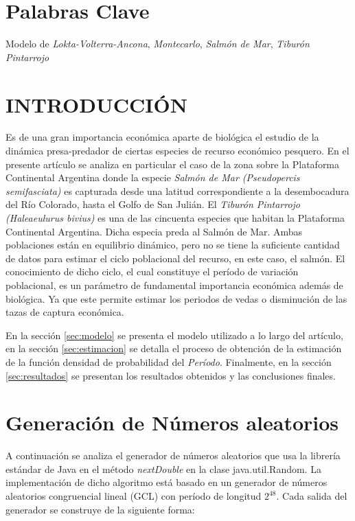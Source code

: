 \documentclass{SPANISH_acm_proc_article-sp}
\begin{document}
\section*{Palabras Clave}
Modelo de \textit{Lokta-Volterra-Ancona}, \textit{Montecarlo}, \textit{Salm\'on de Mar},
\textit{Tibur\'on Pintarrojo}

\section{INTRODUCCI\'ON}
Es de una gran importancia econ\'omica aparte de biol\'ogica el estudio de la din\'amica
presa-predador de ciertas especies de recurso econ\'omico pesquero. En el presente art\'iculo
se analiza en particular el caso de la zona sobre la Plataforma Continental Argentina donde
la especie \emph{Salm\'on de Mar (Pseudopercis semifasciata)} es capturada desde una
latitud correspondiente a la desembocadura del R\'io Colorado, hasta el Golfo de San Juli\'an.
El \emph{Tibur\'on Pintarrojo (Haleaeulurus bivius)} es una de las cincuenta especies que
habitan la Plataforma Continental Argentina. Dicha especia preda al Salm\'on de Mar.
Ambas poblaciones est\'an en equilibrio din\'amico, pero no se tiene la suficiente 
cantidad de datos para estimar el ciclo poblacional del recurso, en este caso, el salm\'on.
El conocimiento de dicho ciclo, el cual constituye el per\'iodo de variaci\'on poblacional,
es un par\'ametro de fundamental importancia econ\'omica adem\'as de biol\'ogica. Ya que
este permite estimar los periodos de vedas o disminuci\'on de las tazas de captura
econ\'omica.

En la secci\'on \ref{sec:modelo} se presenta el modelo utilizado a lo largo del art\'iculo,
en la secci\'on \ref{sec:estimacion} se detalla el proceso de obtenci\'on de la
estimaci\'on de la funci\'on densidad de probabilidad del \emph{Per\'iodo}. Finalmente,
en la secci\'on \ref{sec:resultados} se presentan los resultados obtenidos y las
conclusiones finales.

\section{Generaci\'on de N\'umeros aleatorios}
A continuaci\'on se analiza el generador de n\'umeros aleatorios que usa la librer\'ia est\'andar
de Java en el m\'etodo \textit{nextDouble} en la clase java.util.Random. La implementaci\'on de dicho 
algoritmo est\'a basado en un generador de n\'umeros aleatorios congruencial lineal (GCL) con per\'iodo
de longitud $2^{48}$. Cada salida del generador se construye de la siguiente forma:
\end{document}
